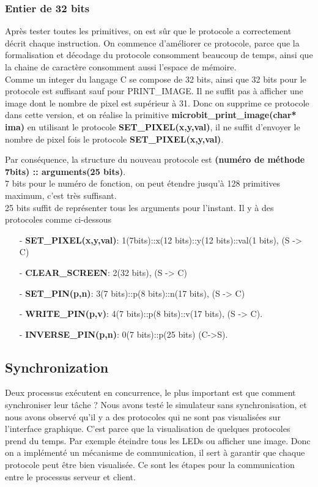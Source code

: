 \documentclass[14px]{article}
\begin{document}
	\subsubsection{Entier de 32 bits}
	Après tester toutes les primitives, on est sûr que le protocole a correctement décrit chaque instruction. On commence d'améliorer ce protocole, parce que la formalisation et décodage du protocole consomment beaucoup de temps, ainsi que la chaine de caractère consomment aussi l'espace de mémoire.\\
	Comme un integer du langage C se compose de 32 bits, ainsi que 32 bits pour le protocole est suffisant sauf pour PRINT\_IMAGE. Il ne suffit pas à afficher une image dont le nombre de pixel est supérieur à 31. Donc on supprime ce protocole dans cette version, et on réalise la primitive \textbf{microbit\_print\_image(char* ima)} en utilisant le protocole \textbf{SET\_PIXEL(x,y,val)}, il ne suffit d'envoyer le nombre de pixel fois le protocole \textbf{SET\_PIXEL(x,y,val)}.

	Par conséquence, la structure du nouveau protocole est \textbf{(numéro de méthode 7bits) :: arguments(25 bits)}.\\
	7 bits pour le numéro de fonction, on peut étendre jusqu'à 128 primitives maximum, c'est très suffisant. \\ 25 bits suffit de représenter tous les arguments pour l'instant.
	Il y à des protocoles comme ci-dessous
	\begin{enumerate}
		\item[-] \textbf{SET\_PIXEL(x,y,val)}: 1(7bits)::x(12 bits)::y(12 bits)::val(1 bits), (S -> C)
		\item[-] \textbf{CLEAR\_SCREEN}: 2(32 bits), (S -> C)
		\item[-] \textbf{SET\_PIN(p,n)}: 3(7 bits)::p(8 bits)::n(17 bits), (S -> C)
		\item[-] \textbf{WRITE\_PIN(p,v)}: 4(7 bits)::p(8 bits)::v(17 bits), (S -> C).\\

		\item[-] \textbf{INVERSE\_PIN(p,n)}: 0(7 bits)::p(25 bits) (C->S).
	\end{enumerate}


	\subsection{Synchronization}
	Deux processus exécutent en concurrence, le plus important est que comment synchroniser leur tâche ? Nous avons testé le simulateur sans synchronisation, et nous avons observé qu'il y a des protocoles qui ne sont pas visualisées sur l'interface graphique. C'est parce que la visualisation de quelques protocoles prend du temps. Par exemple éteindre tous les LEDs ou afficher une image. Donc on a implémenté un mécanisme de communication, il sert à garantir que chaque protocole peut être bien visualisée. Ce sont les étapes pour la communication entre le processus serveur et client.
\end{document}
